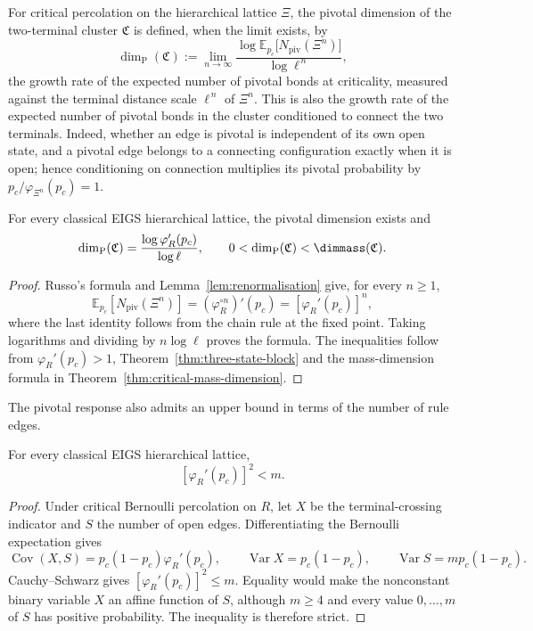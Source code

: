 \begin{definition}\label{def:pivotal-dimension}
For critical percolation on the hierarchical lattice $\Xi$, the pivotal dimension of the two-terminal cluster $\mathfrak C$ is defined, when the limit exists, by
\[
   \dim_{\mathrm P}(\mathfrak C)
   :=
   \displaystyle\lim_{n\to\infty}\frac{\log \mathbb E_{p_c}\bigl[N_{\mathrm{piv}}(\Xi^{n})\bigr]}{\log \ell^{\,n}},
\]
the growth rate of the expected number of pivotal bonds at criticality, measured against the terminal distance scale $\ell^{\,n}$ of $\Xi^{n}$.
This is also the growth rate of the expected number of pivotal bonds in the cluster conditioned to connect the two terminals.
Indeed, whether an edge is pivotal is independent of its own open state, and a pivotal edge belongs to a connecting configuration exactly when it is open; hence conditioning on connection multiplies its pivotal probability by $p_c/\varphi_{\Xi^n}(p_c)=1$.
\end{definition}

\begin{theorem}\label{thm:pivotal-dimension}
For every classical EIGS hierarchical lattice, the pivotal dimension exists and
\[
 \dim_{\mathrm P}(\mathfrak C)=\frac{\log\varphi_R'(p_c)}{\log\ell},
 \qquad 0<\dim_{\mathrm P}(\mathfrak C)<\dimmass(\mathfrak C).
\]
\end{theorem}
\begin{proof}
Russo's formula and Lemma~\ref{lem:renormalisation} give, for every $n\ge1$,
\[
 \mathbb E_{p_c}[N_{\mathrm{piv}}(\Xi^n)]
 =(\varphi_R^{\circ n})'(p_c)=[\varphi_R'(p_c)]^n,
\]
where the last identity follows from the chain rule at the fixed point.
Taking logarithms and dividing by $n\log\ell$ proves the formula.
The inequalities follow from $\varphi_R'(p_c)>1$, Theorem~\ref{thm:three-state-block} and the mass-dimension formula in Theorem~\ref{thm:critical-mass-dimension}.
\end{proof}

The pivotal response also admits an upper bound in terms of the number of rule edges.
\begin{lemma}\label{lem:pivotal-response-bound}
For every classical EIGS hierarchical lattice,
\[
 [\varphi_R'(p_c)]^2<m.
\]
\end{lemma}
\begin{proof}
Under critical Bernoulli percolation on $R$, let $X$ be the terminal-crossing indicator and $S$ the number of open edges.
Differentiating the Bernoulli expectation gives
\[
 \operatorname{Cov}(X,S)=p_c(1-p_c)\varphi_R'(p_c),\qquad
 \operatorname{Var}X=p_c(1-p_c),\qquad
 \operatorname{Var}S=mp_c(1-p_c).
\]
Cauchy--Schwarz gives $[\varphi_R'(p_c)]^2\le m$.
Equality would make the nonconstant binary variable $X$ an affine function of $S$, although $m\ge4$ and every value $0,\ldots,m$ of $S$ has positive probability.
The inequality is therefore strict.
\end{proof}

